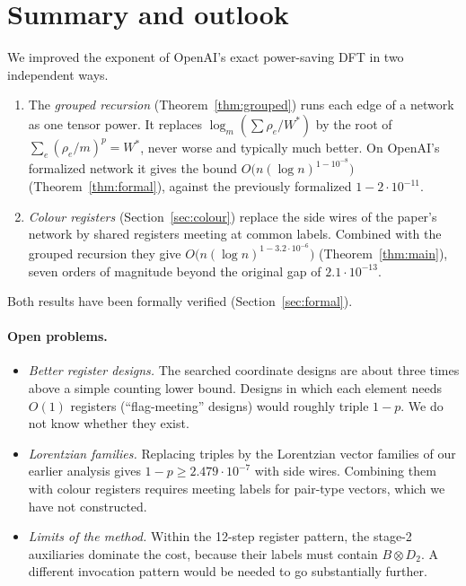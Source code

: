\documentclass[11pt]{article}
\theoremstyle{definition}
\theoremstyle{remark}
\begin{document}
\section{Summary and outlook}\label{sec:summary}

We improved the exponent of OpenAI's exact power-saving DFT in two independent ways.
\begin{enumerate}
\item The \emph{grouped recursion} (Theorem~\ref{thm:grouped}) runs each edge of a network as one tensor
  power. It replaces $\log_m(\sum\rho_e/W^*)$ by the root of $\sum_e(\rho_e/m)^p=W^*$, never worse and
  typically much better. On OpenAI's formalized network it gives the bound
  $O\big(n(\log n)^{1-10^{-8}}\big)$ (Theorem~\ref{thm:formal}), against the previously formalized
  $1-2\cdot10^{-11}$.
\item \emph{Colour registers} (Section~\ref{sec:colour}) replace the side wires of the paper's network
  by shared registers meeting at common labels. Combined with the grouped recursion they give
  $O\big(n(\log n)^{1-3.2\cdot10^{-6}}\big)$ (Theorem~\ref{thm:main}), seven orders of magnitude beyond
  the original gap of $2.1\cdot10^{-13}$.
\end{enumerate}
Both results have been formally verified (Section~\ref{sec:formal}).

\paragraph{Open problems.}
\begin{itemize}
\item \emph{Better register designs.} The searched coordinate designs are about three times above a
  simple counting lower bound. Designs in which each element needs $O(1)$ registers (``flag-meeting''
  designs) would roughly triple $1-p$. We do not know whether they exist.
\item \emph{Lorentzian families.} Replacing triples by the Lorentzian vector families of our earlier
  analysis gives $1-p\ge2.479\cdot10^{-7}$ with side wires. Combining them with colour registers
  requires meeting labels for pair-type vectors, which we have not constructed.
\item \emph{Limits of the method.} Within the 12-step register pattern, the stage-2 auxiliaries
  dominate the cost, because their labels must contain $B\otimes D_2$. A different invocation pattern
  would be needed to go substantially further.
\end{itemize}
\end{document}
